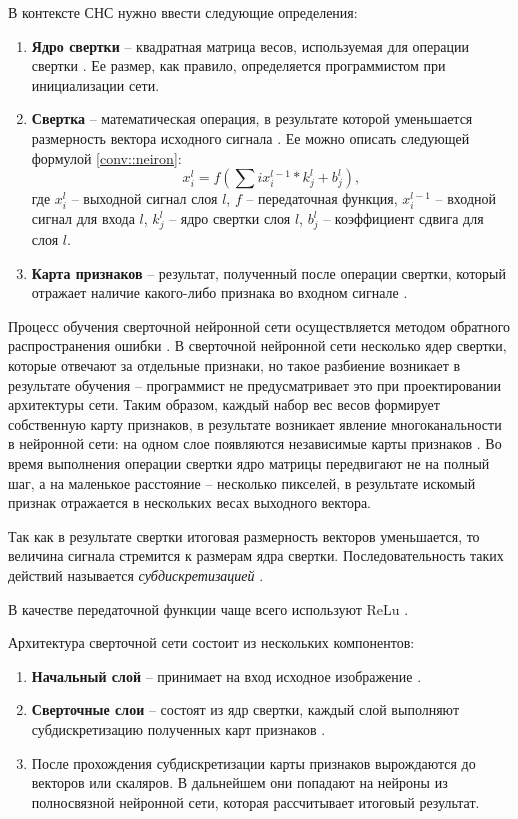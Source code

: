 В контексте СНС нужно ввести следующие определения:
\begin{enumerate}
	\item \textbf{Ядро свертки} -- квадратная матрица весов, используемая для операции свертки \cite{CNN_2}. 
	Ее размер, как правило, определяется программистом при инициализации сети.
	\item \textbf{Свертка} -- математическая операция, в результате которой уменьшается размерность вектора исходного сигнала \cite{CNN_arch}.
	Ее можно описать следующей формулой \ref{conv::neiron}:
	\begin{equation}
	  	\label{conv::neiron}
	  	x_{i}^{l} = f(\sum{}{i} x_{i}^{l-1} * k_{j}^{l} + b_{j}^{l}),
	\end{equation}
	где $x_{i}^{l}$ -- выходной сигнал слоя $l$, $f$ -- передаточная функция, $x_{i}^{l-1}$ -- входной сигнал для входа $l$,
	$k_{j}^{l}$ -- ядро свертки слоя $l$, $b_{j}^{l}$ -- коэффициент сдвига для слоя $l$.
	
	\item \textbf{Карта признаков} -- результат, полученный после операции свертки, который отражает наличие какого-либо признака во входном сигнале \cite{CNN_arch}.
\end{enumerate}

Процесс обучения сверточной нейронной сети осуществляется методом обратного распространения ошибки \cite{CNN_arch}.
В сверточной нейронной сети несколько ядер свертки, которые отвечают за отдельные признаки, но такое разбиение возникает в результате обучения -- программист не предусматривает это при проектировании архитектуры сети.
Таким образом, каждый набор вес весов формирует собственную карту признаков, в результате возникает явление многоканальности в нейронной сети: на одном слое появляются независимые карты признаков \cite{CNN_pool}. 
Во время выполнения операции свертки ядро матрицы передвигают не на полный шаг, а на маленькое расстояние -- несколько пикселей, в результате искомый признак отражается в нескольких весах выходного вектора.

Так как в результате свертки итоговая размерность векторов уменьшается, то величина сигнала стремится к размерам ядра свертки.
Последовательность таких действий называется \textit{субдискретизацией} \cite{CNN_pool}.

В качестве передаточной функции чаще всего используют ReLu \cite{CNN_pool}.

Архитектура сверточной сети состоит из нескольких компонентов:
\begin{enumerate}
	\item \textbf{Начальный слой} -- принимает на вход исходное изображение \cite{CNN_research}.
	\item \textbf{Сверточные слои} -- состоят из ядр свертки, каждый слой выполняют субдискретизацию полученных карт признаков \cite{CNN_research}.
	\item После прохождения субдискретизации карты признаков вырождаются до векторов или скаляров. 
	В дальнейшем они попадают на нейроны из полносвязной нейронной сети, которая рассчитывает итоговый результат.
\end{enumerate}

